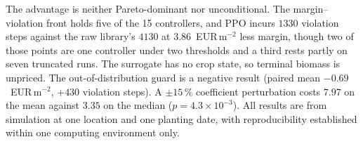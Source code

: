 The advantage is neither Pareto-dominant nor unconditional. The
margin--violation front holds five of the 15 controllers, and PPO
\cite{schulman2017} incurs $1330$ violation steps against the raw library's
$4130$ at $3.86$~EUR\,m$^{-2}$ less margin, though two of those points are
one controller under two thresholds and a third rests partly on seven truncated
runs. The surrogate has no crop state, so terminal biomass is unpriced. The
out-of-distribution guard is a negative result (paired mean
$-0.69$~EUR\,m$^{-2}$, $+430$ violation steps). A $\pm15\,\%$ coefficient
perturbation costs $7.97$ on the mean against $3.35$ on the median
($p=4.3\times10^{-3}$). All results are from simulation at one location and one
planting date, with reproducibility established within one computing environment only.

